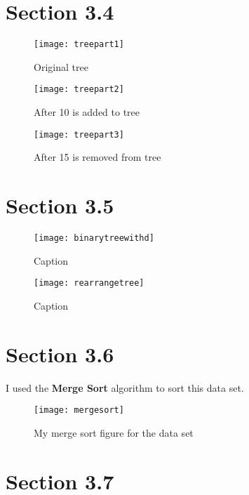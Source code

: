 \documentclass[11pt]{article}
\begin{document}
\section*{Section 3.4}
\begin{figure}[h]
    \centering
    \texttt{[image: treepart1]}
    \caption{Original tree}
    \label{fig:my_label}
\end{figure}

\begin{figure}[h]
    \centering
    \texttt{[image: treepart2]}
    \caption{After 10 is added to tree}
    \label{fig:my_label}
\end{figure}

\begin{figure}[h]
    \centering
    \texttt{[image: treepart3]}
    \caption{After 15 is removed from tree}
    \label{fig:my_label}
\end{figure}

\section*{Section 3.5}
\begin{figure}
    \centering
    \texttt{[image: binarytreewithd]}
    \caption{Caption}
    \label{fig:my_label}
\end{figure}

\begin{figure}
    \centering
    \texttt{[image: rearrangetree]}
    \caption{Caption}
    \label{fig:my_label}
\end{figure}



\section*{Section 3.6}
I used the \textbf{Merge Sort} algorithm to sort this data set.
\begin{figure}
    \centering
    \texttt{[image: mergesort]}
    \caption{My merge sort figure for the data set}
    \label{fig:my_label}
\end{figure}

\section*{Section 3.7}
\end{document}
